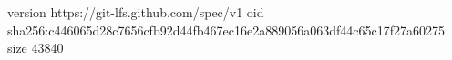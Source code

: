 version https://git-lfs.github.com/spec/v1
oid sha256:c446065d28c7656cfb92d44fb467ec16e2a889056a063df44c65c17f27a60275
size 43840
